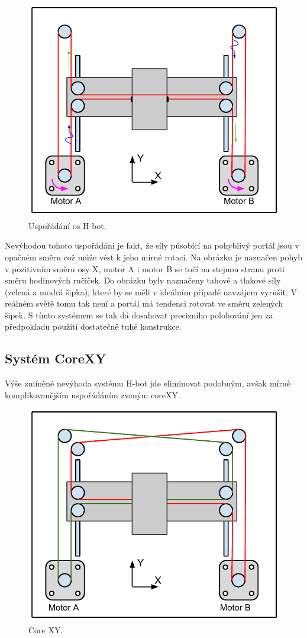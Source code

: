 \begin{figure}[H]
  \centering
    \includegraphics[width=0.6\linewidth]{pdf/Hbot2.pdf}%
    \caption{Uspořádání os H-bot.}
    \label{fig:Hbot}
\end{figure}

Nevýhodou tohoto uspořádání je fakt, že síly působící na pohyblivý portál jsou v opačném směru což může vést k jeho mírné rotaci. Na obrázku je naznačen pohyb v pozitivním směru osy X, motor A i motor B se točí na stejnou stranu proti směru hodinových ručiček. Do obrázku byly naznačeny tahové a tlakové síly (zelená a modrá šipka), které by se měli v ideálním případě navzájem vyrušit. V reálném světě tomu tak není a portál má tendenci rotovat ve směru zelených šipek.
 S tímto systémem se tak dá dosahovat precizního polohování jen za předpokladu použití dostatečně tuhé konstrukce.




\subsection{Systém CoreXY}
Výše zmíněné nevýhoda systému H-bot jde eliminovat podobným, avšak mírně komplikovanějším uspořádáním zvaným coreXY. 

\begin{figure}[H]
  \centering
    \includegraphics[width=0.6\linewidth]{pdf/coreXY2.pdf}%
    \caption{Core XY.}
    \label{fig:coreXY}
\end{figure}

